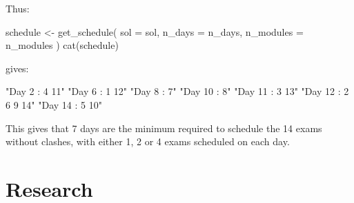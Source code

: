 Thus:

\begin{Rin-no-test}
schedule <- get_schedule(
  sol = sol,
  n_days = n_days,
  n_modules = n_modules
)
cat(schedule)
\end{Rin-no-test}

gives:

\begin{Rout-no-test}

 "Day 2 : 4 11"
 "Day 6 : 1 12"
 "Day 8 : 7"
 "Day 10 : 8"
 "Day 11 : 3 13"
 "Day 12 : 2 6 9 14"
 "Day 14 : 5 10"
\end{Rout-no-test}

This gives that 7 days are the minimum required to schedule the 14 exams without
clashes, with either 1, 2 or 4 exams scheduled on each day.

\section{Research}\label{sec:research}
